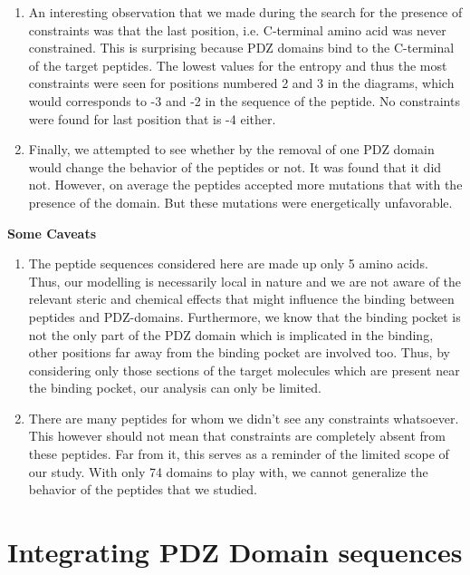 \documentclass[a4paper, 12pt]{article}
\begin{document}
\begin{enumerate}
\item 

An interesting observation that we made during the search for the presence of constraints was that the last position, i.e. C-terminal amino acid was never constrained. This is surprising because PDZ domains bind to the C-terminal of the target peptides. The lowest values for the entropy and thus the most constraints were seen for positions numbered 2 and 3 in the diagrams, which would corresponds to -3 and -2 in the sequence of the peptide. No constraints were found for last position that is -4 either. 

\item 

Finally, we attempted to see whether by the removal of one PDZ domain would change the behavior of the peptides or not. It was found that it did not. However, on average the peptides accepted more mutations that with the presence of the domain. But these mutations were energetically unfavorable. 
\end{enumerate}

\textbf{Some Caveats}

\begin{enumerate} 
\item 
The peptide sequences considered here are made up only 5 amino acids. Thus, our modelling is necessarily local in nature and we are not aware of the relevant steric and chemical effects that might influence the binding between peptides and PDZ-domains. Furthermore, we know that the binding pocket is not the only part of the PDZ domain which is implicated in the binding, other positions far away from the binding pocket are involved too. Thus, by considering only those sections of the target molecules which are present near the binding pocket, our analysis can only be limited. 

\item 
There are many peptides for whom we didn't see any constraints whatsoever. This however should not mean that constraints are completely absent from these peptides. Far from it, this serves as a reminder of the limited scope of our study. With only 74 domains to play with, we cannot generalize the behavior of the peptides that we studied. 

\end{enumerate}

\pagebreak
\part{Integrating PDZ Domain sequences} 
\end{document}
